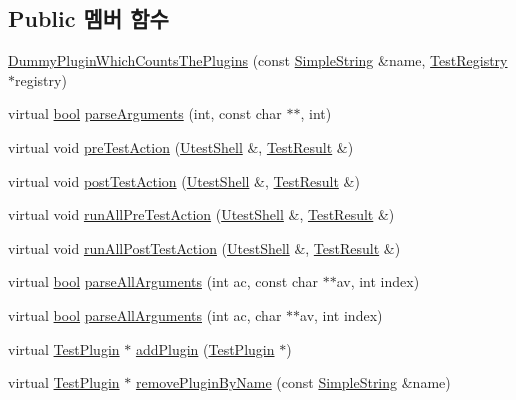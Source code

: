 \subsection*{Public 멤버 함수}
\begin{DoxyCompactItemize}
\item 
\hyperlink{class_dummy_plugin_which_counts_the_plugins_a707bed0f85cf140f2d0bc7bf4f1aef16}{Dummy\+Plugin\+Which\+Counts\+The\+Plugins} (const \hyperlink{class_simple_string}{Simple\+String} \&name, \hyperlink{class_test_registry}{Test\+Registry} $\ast$registry)
\item 
virtual \hyperlink{avb__gptp_8h_af6a258d8f3ee5206d682d799316314b1}{bool} \hyperlink{class_dummy_plugin_which_counts_the_plugins_a167c2b07a0f83726bb9b1d1c0d741f88}{parse\+Arguments} (int, const char $\ast$$\ast$, int)
\item 
virtual void \hyperlink{class_test_plugin_aeb3d3b5a9cbcca6f8f4225bb29554ea2}{pre\+Test\+Action} (\hyperlink{class_utest_shell}{Utest\+Shell} \&, \hyperlink{class_test_result}{Test\+Result} \&)
\item 
virtual void \hyperlink{class_test_plugin_a4d9ea193c7b8e3eb8b50f985f688e4a8}{post\+Test\+Action} (\hyperlink{class_utest_shell}{Utest\+Shell} \&, \hyperlink{class_test_result}{Test\+Result} \&)
\item 
virtual void \hyperlink{class_test_plugin_aa3524b10b0f1613104fa75f1c1a72cf6}{run\+All\+Pre\+Test\+Action} (\hyperlink{class_utest_shell}{Utest\+Shell} \&, \hyperlink{class_test_result}{Test\+Result} \&)
\item 
virtual void \hyperlink{class_test_plugin_ac6e93f69beb5b43b8cedf17a77ccc6b1}{run\+All\+Post\+Test\+Action} (\hyperlink{class_utest_shell}{Utest\+Shell} \&, \hyperlink{class_test_result}{Test\+Result} \&)
\item 
virtual \hyperlink{avb__gptp_8h_af6a258d8f3ee5206d682d799316314b1}{bool} \hyperlink{class_test_plugin_acfa2bcea2c98a16cb7d2a8f177bb84b9}{parse\+All\+Arguments} (int ac, const char $\ast$$\ast$av, int index)
\item 
virtual \hyperlink{avb__gptp_8h_af6a258d8f3ee5206d682d799316314b1}{bool} \hyperlink{class_test_plugin_a6d3fb0408bb544bd7ec5ba9300328a5e}{parse\+All\+Arguments} (int ac, char $\ast$$\ast$av, int index)
\item 
virtual \hyperlink{class_test_plugin}{Test\+Plugin} $\ast$ \hyperlink{class_test_plugin_ac63612b566d31b52b9c09e0552f8fe9b}{add\+Plugin} (\hyperlink{class_test_plugin}{Test\+Plugin} $\ast$)
\item 
virtual \hyperlink{class_test_plugin}{Test\+Plugin} $\ast$ \hyperlink{class_test_plugin_a75abbb424eeb5b1466272ab22dd2cfcf}{remove\+Plugin\+By\+Name} (const \hyperlink{class_simple_string}{Simple\+String} \&name)
$$
\end{DoxyCompactItemize}
